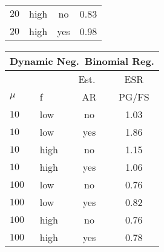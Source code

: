 \begin{table}
\begin{center}
\begin{tabular}{l l c c}
      $20$ & high & no & 0.83 \\
      $20$ & high & yes & 0.98
    \end{tabular}
    \hspace{12pt}
    \begin{tabular}{l l c c}
      \multicolumn{4}{c}{Dynamic Neg.\ Binomial Reg.} \\
      \hline
      & & Est.\ & ESR \\
      $\mu$ & f & AR & PG/FS \\
      \hline
      $10$ & low & no & 1.03 \\
      $10$ & low & yes & 1.86 \\

      $10$ & high & no & 1.15 \\
      $10$ & high & yes & 1.06 \\

      $100$ & low & no & 0.76 \\
      $100$ & low & yes & 0.82 \\

      $100$ & high & no & 0.76 \\
      $100$ & high & yes & 0.78 \\


\end{tabular}
\end{center}
\end{table}
